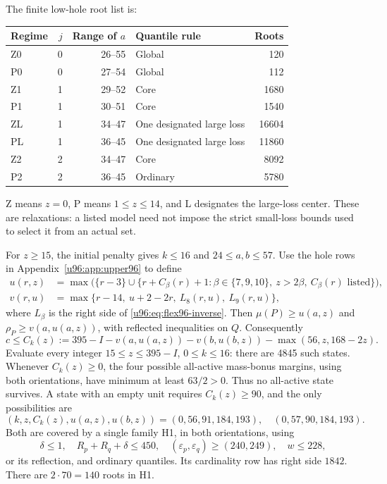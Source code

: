 \documentclass[11pt,a4paper]{article}
\theoremstyle{remark}
\begin{document}
The finite low-hole root list is:
\begin{center}\small
\begin{tabular}{lrrlr}
\toprule
Regime&$j$&Range of $a$&Quantile rule&Roots\\\midrule
Z0&0&26--55&Global&120\\
P0&0&27--54&Global&112\\
Z1&1&29--52&Core&1680\\
P1&1&30--51&Core&1540\\
ZL&1&34--47&One designated large loss&16604\\
PL&1&36--45&One designated large loss&11860\\
Z2&2&34--47&Core&8092\\
P2&2&36--45&Ordinary&5780\\\bottomrule
\end{tabular}
\end{center}
Z means $z=0$, P means $1\leq z\leq14$, and L designates the large-loss
center. These are relaxations: a listed model need not impose the strict
small-loss bounds used to select it from an actual set.

For $z\geq15$, the initial penalty gives $k\leq16$ and $24\leq a,b\leq57$.
Use the hole rows in Appendix~\ref{u96:app:upper96} to define
\begin{align*}
 u(r,z)&=\max\bigl(\{r-3\}\cup
       \{r+C_\beta(r)+1:\beta\in\{7,9,10\},\ z>2\beta,
                                  \ C_\beta(r)\text{ listed}\}\bigr),\\
 v(r,u)&=\max\{r-14,\ u+2-2r,\ L_8(r,u),\ L_9(r,u)\},
\end{align*}
where $L_\beta$ is the right side of \eqref{u96:eq:flex96-inverse}.
Then $\mu(P)\geq u(a,z)$ and $\rho_P\geq v(a,u(a,z))$, with reflected
inequalities on $Q$. Consequently
\[
 c\leq C_k(z):=395-I-v(a,u(a,z))-v(b,u(b,z))
                         -\max(56,z,168-2z).
\]
Evaluate every integer $15\leq z\leq395-I$, $0\leq k\leq16$:
there are 4845 such states. Whenever $C_k(z)\geq0$, the four possible
all-active mass-bonus margins, using both orientations, have minimum
at least $63/2>0$. Thus no all-active state survives. A state with an
empty unit requires $C_k(z)\geq90$, and the only possibilities are
\[
 (k,z,C_k(z),u(a,z),u(b,z))
 =(0,56,91,184,193),\quad(0,57,90,184,193).
\]
Both are covered by a single family H1, in both orientations, using
\[
 \delta\leq1,\quad R_p+R_q+\delta\leq450,\quad
 (\varepsilon_p,\varepsilon_q)\geq(240,249),\quad w\leq228,
\]
or its reflection, and ordinary quantiles. Its cardinality row has
right side $1842$. There are $2\cdot70=140$ roots in H1.
\end{document}
